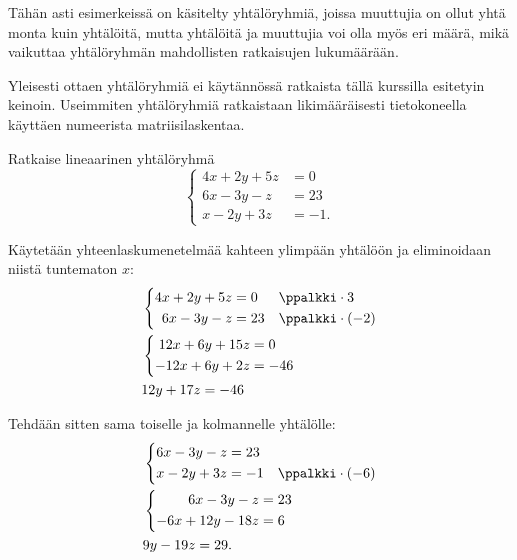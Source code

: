 Tähän asti esimerkeissä on käsitelty yhtälöryhmiä, joissa muuttujia on ollut yhtä monta kuin yhtälöitä, mutta yhtälöitä ja muuttujia voi olla myös eri määrä, mikä vaikuttaa yhtälöryhmän mahdollisten ratkaisujen lukumäärään.

Yleisesti ottaen yhtälöryhmiä ei käytännössä ratkaista tällä kurssilla esitetyin keinoin. Useimmiten yhtälöryhmiä ratkaistaan likimääräisesti tietokoneella käyttäen numeerista matriisilaskentaa.


\begin{esimerkki}
Ratkaise lineaarinen yhtälöryhmä
\[
\left\{
\begin{aligned}
4x+2y+5z&=0 \\
6x-3y-z&= 23 \\
x-2y+3z&= -1.
\end{aligned}
\right.
\]
\begin{esimratk}
Käytetään yhteenlaskumenetelmää kahteen ylimpään yhtälöön ja eliminoidaan niistä tuntematon $x$:
\begin{align*}
&\left\{
\begin{aligned}
4x+2y+5z&=0 && \ppalkki \cdot 3 \\
6x-3y-z&= 23 && \ppalkki \cdot (-2) \\
\end{aligned}
\right. \\
&\left\{
\begin{aligned}
12x+6y+15z&=0 \\
-12x+6y+2z&= -46 \\
\end{aligned}
\right. \\
&12y+17z=-46 \\
\end{align*}

Tehdään sitten sama toiselle ja kolmannelle yhtälölle:
\begin{align*}
&\left\{
\begin{aligned}
6x-3y-z&= 23 && \\
x-2y+3z&= -1 && \ppalkki \cdot (-6)
\end{aligned}
\right. \\
&\left\{
\begin{aligned}
6x-3y-z&= 23 \\
-6x+12y-18z&=6
\end{aligned}
\right. \\
&9y-19z=29. \\
\end{align*}


\end{esimratk}
\end{esimerkki}
